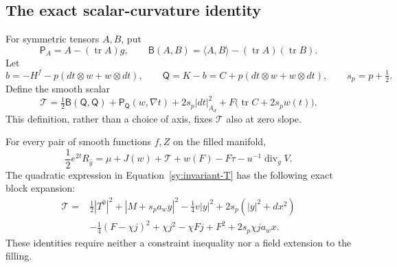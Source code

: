 \subsection{The exact scalar-curvature identity}

For symmetric tensors $A,B$, put
\[
 \mathsf P_A=A-(\operatorname{tr}A)g,\qquad
 \mathsf B(A,B)=\langle A,B\rangle
                   -(\operatorname{tr}A)(\operatorname{tr}B).
\]
Let
\begin{equation}\label{sy:stationary-tensors}
 b=-H^f-p(dt\otimes w+w\otimes dt),\qquad
 \mathsf Q=K-b=C+p(dt\otimes w+w\otimes dt),\qquad
 s_p=p+\tfrac12.
\end{equation}
Define the smooth scalar
\begin{equation}\label{sy:invariant-T}
 \mathcal T=\tfrac12\mathsf B(\mathsf Q,\mathsf Q)
 +\mathsf P_{\mathsf Q}(w,\nabla t)
 +2s_p|dt|_{A_d}^2
 +F\bigl(\operatorname{tr}C+2s_p w(t)\bigr).
\end{equation}
This definition, rather than a choice of axis, fixes $\mathcal T$
also at zero slope.

\begin{proposition}\label{sy:scalar-identity}
For every pair of smooth functions $f,Z$ on the filled manifold,
\begin{equation}\label{sy:scalar-equation}
 \frac12e^{2t}R_{\widehat g}
 =\mu+J(w)+\mathcal T+w(F)-F\tau
       -u^{-1}\operatorname{div}_g V.
\end{equation}
The quadratic expression in Equation~\ref{sy:invariant-T} has the
following exact block expansion:
\begin{equation}\label{sy:expanded-T}
\begin{aligned}
 \mathcal T={}&\tfrac12|T^0|^2+|M+s_pa_wy|^2
       -\tfrac14v|y|^2+2s_p(|y|^2+dx^2)\\
 &-\tfrac14(F-\chi j)^2+\chi j^2-\chi Fj+F^2
       +2s_p\chi ja_wx.
\end{aligned}
\end{equation}
These identities require neither a constraint inequality nor a
field extension to the filling.
\end{proposition}

